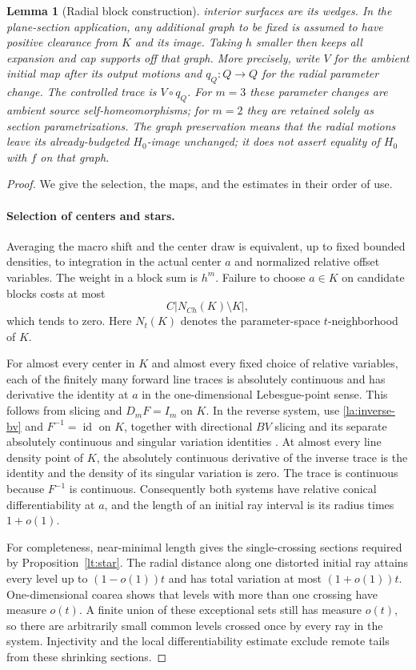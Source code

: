 \documentclass[11pt]{article}
\numberwithin{equation}{section}
\newtheorem{lemma}[theorem]{Lemma}
\theoremstyle{definition}
\theoremstyle{remark}
\newcommand{\Id}{\operatorname{id}}
\begin{document}
\begin{lemma}[Radial block construction]
interior surfaces are its wedges.  In the plane-section application,
any additional graph to be fixed is assumed to have positive
clearance from $K$ and its image.  Taking $h$ smaller then keeps all
expansion and cap supports off that graph.  More precisely, write
$V$ for the ambient initial map after its output motions and
$q_Q:Q\to Q$ for the radial parameter change.  The controlled trace
is $V\circ q_Q$.  For $m=3$ these parameter changes are ambient
source self-homeomorphisms; for $m=2$ they are retained solely as
section parametrizations.  The graph preservation means that the
radial motions leave its already-budgeted $H_0$-image unchanged;
it does not assert equality of $H_0$ with $f$ on that graph.
\end{lemma}

\begin{proof}
We give the selection, the maps, and the estimates in their order of
use.

\paragraph{Selection of centers and stars.}
Averaging the macro shift and the center draw is equivalent, up to
fixed bounded densities, to integration in the actual center $a$ and
normalized relative offset variables.  The weight in a block sum is
$h^m$.  Failure to choose $a\in K$ on candidate blocks costs at most
\[
 C\bigl|N_{Ch}(K)\setminus K\bigr|,
\]
which tends to zero.  Here $N_t(K)$ denotes the parameter-space
$t$-neighborhood of $K$.

For almost every center in $K$ and almost every fixed choice of
relative variables, each of the finitely many forward line traces is
absolutely continuous and has derivative the identity at $a$ in the
one-dimensional Lebesgue-point sense.  This follows from slicing and
$D_mF=I_m$ on $K$.  In the reverse system, use
\eqref{la:inverse-bv} and $F^{-1}=\Id$ on $K$, together with directional
$BV$ slicing and its separate absolutely continuous and singular
variation identities
\cite[Section~3.11, Theorems~3.103, 3.107, and~3.108]{AmbrosioFuscoPallara2000}.
At almost every line
density point of $K$, the absolutely continuous derivative of the
inverse trace is the identity and the density of its singular
variation is zero.  The trace is continuous because $F^{-1}$ is
continuous.  Consequently both systems have relative conical
differentiability at $a$, and the length of an initial ray interval is
its radius times $1+o(1)$.

For completeness, near-minimal length gives the single-crossing
sections required by Proposition~\ref{lt:star}.  The radial distance along
one distorted initial ray attains every level up to $(1-o(1))t$ and
has total variation at most $(1+o(1))t$.  One-dimensional coarea shows
that levels with more than one crossing have measure $o(t)$.  A finite
union of these exceptional sets still has measure $o(t)$, so there
are arbitrarily small common levels crossed once by every ray in
the system.  Injectivity and the local differentiability estimate
exclude remote tails from these shrinking sections.


\end{proof}
\end{document}
